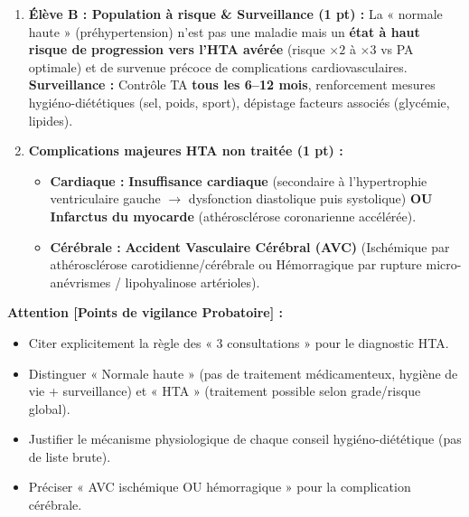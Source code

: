 \documentclass[11pt]{article}
\begin{document}
\begin{corrige}
\begin{enumerate}
\begin{enumerate}
        \item \textbf{Adoption régime type DASH / Méditerranéen :} Riches en fruits/légumes (K$^+$, Mg$^{2+}$, fibres, antioxydants), céréales complètes, poissons, huiles végétales ; pauvres en graisses saturées, sucres ajoutés. \textbf{Mécanisme :} Apport en potassium favorise la natriurèse (excrétion Na$^+$) ; amélioration profil lipidique et inflammation vasculaire.
    \end{enumerate}
    \item \textbf{Élève B : Population à risque \& Surveillance (1 pt) :} La « normale haute » (préhypertension) n'est pas une maladie mais un \textbf{état à haut risque de progression vers l'HTA avérée} (risque $\times 2$ à $\times 3$ vs PA optimale) et de survenue précoce de complications cardiovasculaires. \textbf{Surveillance :} Contrôle TA \textbf{tous les 6--12 mois}, renforcement mesures hygiéno-diététiques (sel, poids, sport), dépistage facteurs associés (glycémie, lipides).
    \item \textbf{Complications majeures HTA non traitée (1 pt) :}
    \begin{itemize}
        \item \textbf{Cardiaque :} \textbf{Insuffisance cardiaque} (secondaire à l'hypertrophie ventriculaire gauche $\to$ dysfonction diastolique puis systolique) \textbf{OU} \textbf{Infarctus du myocarde} (athérosclérose coronarienne accélérée).
        \item \textbf{Cérébrale :} \textbf{Accident Vasculaire Cérébral (AVC)} (Ischémique par athérosclérose carotidienne/cérébrale ou Hémorragique par rupture micro-anévrismes / lipohyalinose artérioles).
    \end{itemize}
\end{enumerate}
\par\textbf{Attention [Points de vigilance Probatoire] :}
\begin{itemize}
    \item Citer explicitement la règle des « 3 consultations » pour le diagnostic HTA.
    \item Distinguer « Normale haute » (pas de traitement médicamenteux, hygiène de vie + surveillance) et « HTA » (traitement possible selon grade/risque global).
    \item Justifier le mécanisme physiologique de chaque conseil hygiéno-diététique (pas de liste brute).
    \item Préciser « AVC ischémique OU hémorragique » pour la complication cérébrale.
\end{itemize}
\end{corrige}
\end{document}
